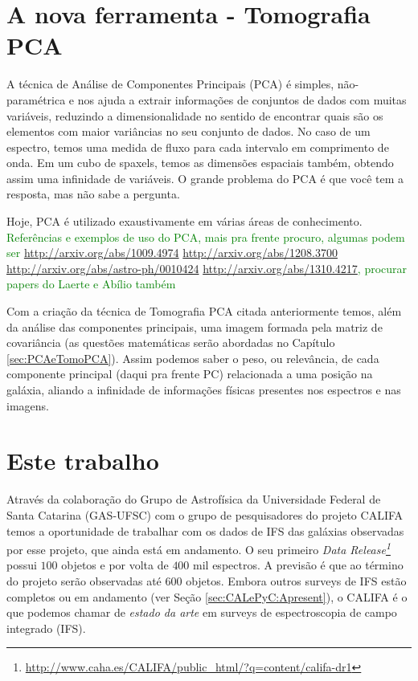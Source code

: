 \section{A nova ferramenta - Tomografia PCA}
\label{sec:Intro:TomoPCA}

A técnica de Análise de Componentes Principais (PCA) é simples, não-paramétrica
e nos ajuda a extrair informações de conjuntos de dados com muitas variáveis,
reduzindo a dimensionalidade no sentido de encontrar quais são os elementos com
maior variâncias no seu conjunto de dados. No caso de um espectro, temos uma
medida de fluxo para cada intervalo em comprimento de onda. Em um cubo de
spaxels, temos as dimensões espaciais também, obtendo assim uma infinidade de
variáveis. O grande problema do PCA é que você tem a resposta, mas não sabe a
pergunta.

Hoje, PCA é utilizado exaustivamente em várias áreas de conhecimento. \ojo
\citneed \textcolor{green}{Referências e exemplos de uso do PCA, mais pra
frente procuro, algumas podem ser 
\url{http://arxiv.org/abs/1009.4974}
\url{http://arxiv.org/abs/1208.3700}
\url{http://arxiv.org/abs/astro-ph/0010424}
\url{http://arxiv.org/abs/1310.4217}, procurar papers do Laerte e Abílio
também}

Com a criação da técnica de Tomografia PCA citada anteriormente temos, além da
análise das componentes principais, uma imagem formada pela matriz de
covariância (as questões matemáticas serão abordadas no Capítulo
\ref{sec:PCAeTomoPCA}). Assim podemos saber o peso, ou relevância, de cada
componente principal (daqui pra frente PC) relacionada a uma posição na galáxia,
aliando a infinidade de informações físicas presentes nos espectros e nas
imagens.

\section{Este trabalho}
\label{sec:Intro:ThisWork}

Através da colaboração do Grupo de Astrofísica da Universidade Federal de Santa
Catarina (GAS-UFSC) com o grupo de pesquisadores do projeto CALIFA temos a
oportunidade de trabalhar com os dados de IFS das galáxias observadas por esse
projeto, que ainda está em andamento. O seu primeiro {\em Data
Release\footnote{\url{http://www.caha.es/CALIFA/public_html/?q=content/califa-dr1}}}
\citep[][DR1]{Husemann2013} possui $100$ objetos e por volta de $400$ mil
espectros. A previsão é que ao término do projeto serão observadas até $600$
objetos. Embora outros surveys de IFS estão completos ou em andamento (ver Seção
\ref{sec:CALePyC:Apresent}), o CALIFA é o que podemos chamar de {\em estado da
arte} em surveys de espectroscopia de campo integrado (IFS).

